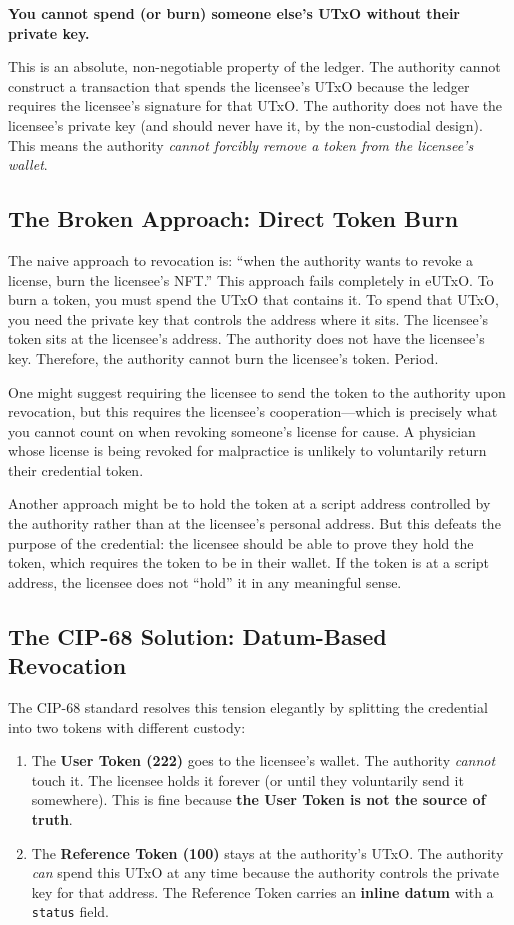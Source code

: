\textbf{You cannot spend (or burn) someone else's UTxO without their private key.}

This is an absolute, non-negotiable property of the ledger. The authority cannot construct a transaction that spends the licensee's UTxO because the ledger requires the licensee's signature for that UTxO. The authority does not have the licensee's private key (and should never have it, by the non-custodial design). This means the authority \emph{cannot forcibly remove a token from the licensee's wallet}.

\subsection{The Broken Approach: Direct Token Burn}

The naive approach to revocation is: ``when the authority wants to revoke a license, burn the licensee's NFT.'' This approach fails completely in eUTxO. To burn a token, you must spend the UTxO that contains it. To spend that UTxO, you need the private key that controls the address where it sits. The licensee's token sits at the licensee's address. The authority does not have the licensee's key. Therefore, the authority cannot burn the licensee's token. Period.

One might suggest requiring the licensee to send the token to the authority upon revocation, but this requires the licensee's cooperation---which is precisely what you cannot count on when revoking someone's license for cause. A physician whose license is being revoked for malpractice is unlikely to voluntarily return their credential token.

Another approach might be to hold the token at a script address controlled by the authority rather than at the licensee's personal address. But this defeats the purpose of the credential: the licensee should be able to prove they hold the token, which requires the token to be in their wallet. If the token is at a script address, the licensee does not ``hold'' it in any meaningful sense.

\subsection{The CIP-68 Solution: Datum-Based Revocation}

The CIP-68 standard resolves this tension elegantly by splitting the credential into two tokens with different custody:

\begin{enumerate}[nosep]
  \item The \textbf{User Token (222)} goes to the licensee's wallet. The authority \emph{cannot} touch it. The licensee holds it forever (or until they voluntarily send it somewhere). This is fine because \textbf{the User Token is not the source of truth}.
  \item The \textbf{Reference Token (100)} stays at the authority's UTxO. The authority \emph{can} spend this UTxO at any time because the authority controls the private key for that address. The Reference Token carries an \textbf{inline datum} with a \texttt{status} field.
\end{enumerate}

